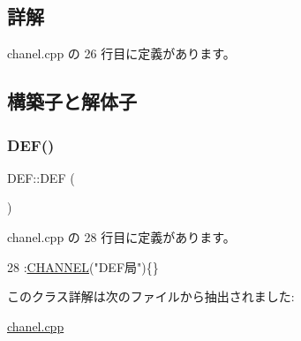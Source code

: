 \subsection{詳解}


 chanel.\+cpp の 26 行目に定義があります。



\subsection{構築子と解体子}
\mbox{\label{class_d_e_f_a359a19dbba360787927e4a30485c6cde}} 
\subsubsection{\texorpdfstring{D\+E\+F()}{DEF()}}
{\footnotesize\ttfamily D\+E\+F\+::\+D\+EF (\begin{DoxyParamCaption}{ }\end{DoxyParamCaption})\hspace{0.3cm}{\ttfamily [inline]}}



 chanel.\+cpp の 28 行目に定義があります。


\begin{DoxyCode}
28 :\hyperlink{class_c_h_a_n_n_e_l_a233c9484f865fee53d66da81fb6b9e2d}{CHANNEL}(\textcolor{stringliteral}{"DEF局"})\{\}
\end{DoxyCode}


このクラス詳解は次のファイルから抽出されました\+:\begin{DoxyCompactItemize}
\item 
\hyperlink{chanel_8cpp}{chanel.\+cpp}\end{DoxyCompactItemize}

